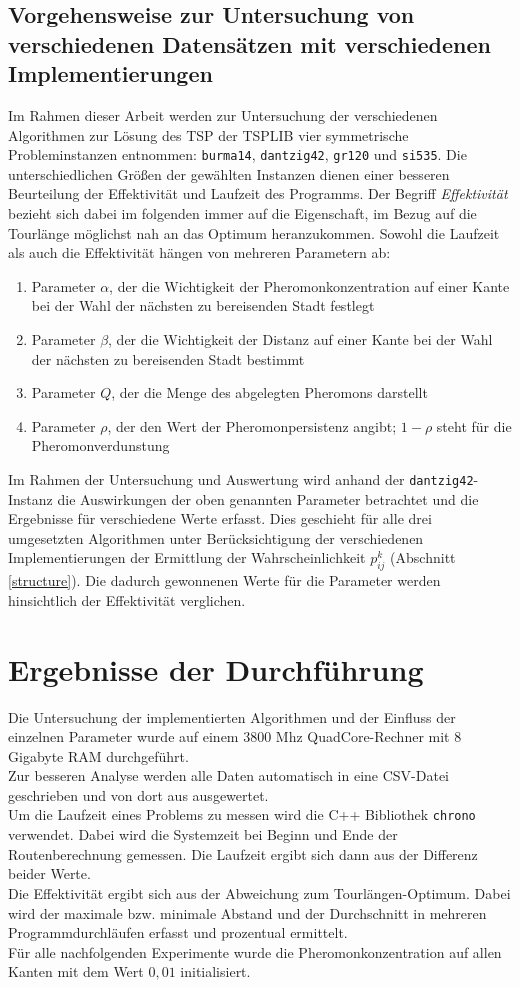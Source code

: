 \documentclass[doktyp=barbeit, sprache=german]{TUBAFarbeiten}
\begin{document}
\subsection{Vorgehensweise zur Untersuchung von verschiedenen Datensätzen mit verschiedenen Implementierungen}
\label{sec:vorgehensweise}
Im Rahmen dieser Arbeit werden zur Untersuchung der verschiedenen Algorithmen zur Lösung des TSP der TSPLIB vier symmetrische Probleminstanzen entnommen: \texttt{burma14}, \texttt{dantzig42}, \texttt{gr120} und \texttt{si535}.
Die unterschiedlichen Größen der gewählten Instanzen dienen einer besseren Beurteilung der Effektivität und Laufzeit des Programms.
Der Begriff \textit{Effektivität} bezieht sich dabei im folgenden immer auf die Eigenschaft, im Bezug auf die Tourlänge möglichst nah an das Optimum heranzukommen. Sowohl die Laufzeit als auch die Effektivität hängen von mehreren Parametern ab:
\begin{enumerate}
\item Parameter $\alpha$, der die Wichtigkeit der Pheromonkonzentration auf einer Kante bei der Wahl der nächsten zu bereisenden Stadt festlegt
\item Parameter $\beta$, der die Wichtigkeit der Distanz auf einer Kante bei der Wahl der nächsten zu bereisenden Stadt bestimmt
\item Parameter $Q$, der die Menge des abgelegten Pheromons darstellt
\item Parameter $\rho$, der den Wert der Pheromonpersistenz angibt; $1 - \rho$ steht für die Pheromonverdunstung
\end{enumerate}
Im Rahmen der Untersuchung und Auswertung wird anhand der \texttt{dantzig42}-Instanz die Auswirkungen der oben genannten Parameter betrachtet und die Ergebnisse für verschiedene Werte erfasst.
Dies geschieht für alle drei umgesetzten Algorithmen unter Berücksichtigung der verschiedenen Implementierungen der Ermittlung der Wahrscheinlichkeit $p^k_{ij}$ (Abschnitt \ref{structure}).
Die dadurch gewonnenen Werte für die Parameter werden hinsichtlich der Effektivität verglichen. 
\newpage\section{Ergebnisse der Durchführung}
Die Untersuchung der implementierten Algorithmen und der Einfluss der einzelnen Parameter wurde auf einem 3800 Mhz QuadCore-Rechner mit 8 Gigabyte RAM durchgeführt. 
\\Zur besseren Analyse werden alle Daten automatisch in eine CSV-Datei geschrieben und von dort aus ausgewertet.
\\Um die Laufzeit eines Problems zu messen wird die C++ Bibliothek \texttt{chrono} verwendet. Dabei wird die Systemzeit bei Beginn und Ende der Routenberechnung gemessen. Die Laufzeit ergibt sich dann aus der Differenz beider Werte. 
\\Die Effektivität ergibt sich aus der Abweichung zum Tourlängen-Optimum. Dabei wird der maximale bzw. minimale Abstand und der Durchschnitt in mehreren Programmdurchläufen erfasst und prozentual ermittelt.
\\Für alle nachfolgenden Experimente wurde die Pheromonkonzentration auf allen Kanten mit dem Wert $0,01$ initialisiert.
\end{document}
